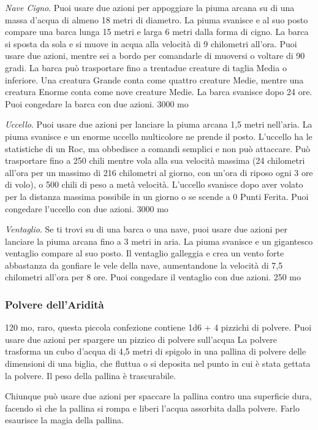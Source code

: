\begin{multicols}{2}
\textit{Nave Cigno}. Puoi usare due azioni per appoggiare la piuma arcana su di una massa d'acqua di almeno 18 metri di diametro. La piuma svanisce e al suo posto compare una barca lunga 15 metri e larga 6 metri dalla forma di cigno. La barca si sposta da sola e si muove in acqua alla velocità di 9 chilometri all'ora. Puoi usare due azioni, mentre sei a bordo per comandarle di muoversi o voltare di 90 gradi. La barca può trasportare fino a trentadue creature di taglia Media o inferiore. Una creatura Grande conta come quattro creature Medie, mentre una creatura Enorme conta come nove creature Medie. La barca svanisce dopo 24 ore. Puoi congedare la barca con due azioni. 3000 mo

\textit{Uccello}. Puoi usare due azioni per lanciare la piuma arcana 1,5 metri nell'aria. La piuma svanisce e un enorme uccello multicolore ne prende il posto. L'uccello ha le statistiche di un Roc, ma obbedisce a comandi semplici e non può attaccare. Può trasportare fino a 250 chili mentre vola alla sua velocità massima (24 chilometri all'ora per un massimo di 216 chilometri al giorno, con un'ora di riposo ogni 3 ore di volo), o 500 chili di peso a metà velocità. L'uccello svanisce dopo aver volato per la distanza massima possibile in un giorno o se scende a 0 Punti Ferita. Puoi congedare l'uccello con due azioni. 3000 mo

\textit{Ventaglio}. Se ti trovi su di una barca o una nave, puoi usare due azioni per lanciare la piuma arcana fino a 3 metri in aria. La piuma svanisce e un gigantesco ventaglio compare al suo posto. Il ventaglio galleggia e crea un vento forte abbastanza da gonfiare le vele della nave, aumentandone la velocità di 7,5 chilometri all'ora per 8 ore. Puoi congedare il ventaglio con due azioni. 250 mo

\subsubsection*{Polvere dell'Aridità}
120 mo, raro, questa piccola confezione contiene 1d6 + 4 pizzichi di polvere. Puoi usare due azioni per spargere un pizzico di polvere sull'acqua La polvere trasforma un cubo d'acqua di 4,5 metri di spigolo in una pallina di polvere delle dimensioni di una biglia, che fluttua o si deposita nel punto in cui è stata gettata la polvere. Il peso della pallina è trascurabile.

Chiunque può usare due azioni per spaccare la pallina contro una superficie dura, facendo sì che la pallina si rompa e liberi l'acqua assorbita dalla polvere. Farlo esaurisce la magia della pallina.


\end{multicols}

